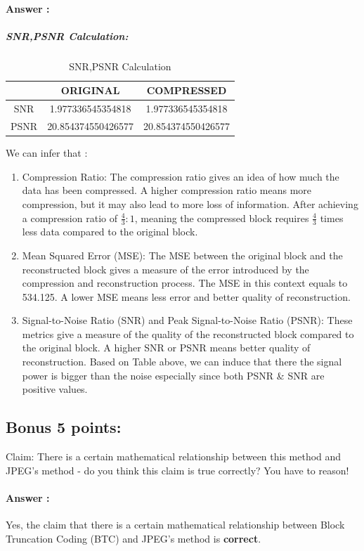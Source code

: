 \documentclass[letterpaper, 12pt]{article}
\begin{document}
\paragraph{Answer :}
\subparagraph{SNR,PSNR Calculation:}

\begin{table}
    \centering
    \begin{tabular}{|c|c|c|} \hline 
         &  ORIGINAL& COMPRESSED\\ \hline 
         SNR&  1.977336545354818& 1.977336545354818\\ \hline 
         PSNR&  20.854374550426577& 20.854374550426577\\ \hline
    \end{tabular}
    \caption{SNR,PSNR Calculation}
    \label{tab:my_label}
\end{table}

We can infer that :
\begin{enumerate}
    \item Compression Ratio: The compression ratio gives an idea of how much the data has been compressed. A higher compression ratio means more compression, but it may also lead to more loss of information. After achieving a compression ratio of $\frac{4}{3}:1$, meaning the compressed block requires $\frac{4}{3}$ times less data compared to the original block. 
    \item Mean Squared Error (MSE): The MSE between the original block and the reconstructed block gives a measure of the error introduced by the compression and reconstruction process. The MSE in this context equals to 534.125. A lower MSE means less error and better quality of reconstruction.
    \item Signal-to-Noise Ratio (SNR) and Peak Signal-to-Noise Ratio (PSNR): These metrics give a measure of the quality of the reconstructed block compared to the original block. A higher SNR or PSNR means better quality of reconstruction. Based on Table above, we can induce that there the signal power is bigger than the noise especially since both PSNR \& SNR are positive values.
\end{enumerate}


\subsection{Bonus 5 points:}
Claim: There is a certain mathematical relationship between this method and JPEG's method - do you think this claim is true
correctly? You have to reason!
\paragraph{Answer :}
Yes, the claim that there is a certain mathematical relationship between Block Truncation Coding (BTC) and JPEG's method is \textbf{correct}. \\
\end{document}
